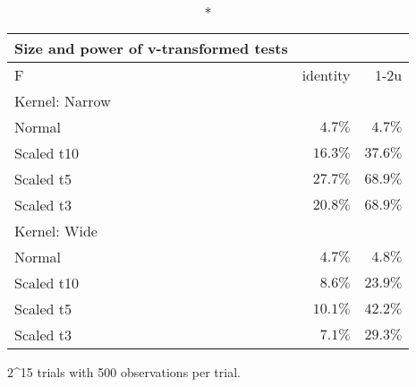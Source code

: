 \setlength{\LTpost}{0mm}
\begin{longtable}{lrr}
\caption*{
{\large Size and power of v-transformed tests}
} \\ 
\toprule
F & identity & \textbar{}1-2u\textbar{} \\ 
\midrule
\multicolumn{3}{l}{Kernel: Narrow} \\ 
\midrule
Normal & $4.7\%$ & $4.7\%$ \\ 
Scaled t10 & $16.3\%$ & $37.6\%$ \\ 
Scaled t5 & $27.7\%$ & $68.9\%$ \\ 
Scaled t3 & $20.8\%$ & $68.9\%$ \\ 
\midrule
\multicolumn{3}{l}{Kernel: Wide} \\ 
\midrule
Normal & $4.7\%$ & $4.8\%$ \\ 
Scaled t10 & $8.6\%$ & $23.9\%$ \\ 
Scaled t5 & $10.1\%$ & $42.2\%$ \\ 
Scaled t3 & $7.1\%$ & $29.3\%$ \\ 
\bottomrule
\end{longtable}
\begin{minipage}{\linewidth}
2\textasciicircum{}15 trials with 500 observations per trial.\\
\end{minipage}

